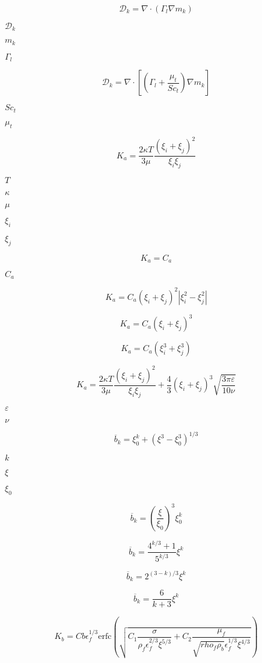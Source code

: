 \documentclass{article}
\begin{document}
\[ \mathcal{D}_k = \nabla \cdot \left( \Gamma_l \nabla m_k \right) \]
\pagebreak

$ \mathcal{D}_k $
\pagebreak

$ m_k $
\pagebreak

$ \Gamma_l $
\pagebreak

\[ \mathcal{D}_k = \nabla \cdot \left[ \left( \Gamma_l + \frac{\mu_t}{Sc_t} \right) \nabla m_k \right] \]
\pagebreak

$ Sc_t $
\pagebreak

$ \mu_t $
\pagebreak

\[ K_a = \frac{2 \kappa T}{3 \mu} \frac{(\xi_i + \xi_j)^2}{\xi_i \xi_j} \]
\pagebreak

$ T $
\pagebreak

$ \kappa $
\pagebreak

$ \mu $
\pagebreak

$ \xi_i $
\pagebreak

$ \xi_j $
\pagebreak

\[ K_a = C_a \]
\pagebreak

$ C_a $
\pagebreak

\[ K_a = C_a (\xi_i + \xi_j)^2 |\xi_i^2 - \xi_j^2| \]
\pagebreak

\[ K_a = C_a (\xi_i + \xi_j)^3 \]
\pagebreak

\[ K_a = C_a (\xi_i^3 + \xi_j^3) \]
\pagebreak

\[ K_a = \frac{2 \kappa T}{3 \mu} \frac{(\xi_i + \xi_j)^2}{\xi_i \xi_j} + \frac{4}{3} (\xi_i + \xi_j)^3 \sqrt{\frac{3 \pi \varepsilon}{10 \nu}} \]
\pagebreak

$ \varepsilon $
\pagebreak

$ \nu $
\pagebreak

\[ \overline{b}_k = \xi_0^k + (\xi^3 - \xi_0^3)^{1/3} \]
\pagebreak

$ k $
\pagebreak

$ \xi $
\pagebreak

$ \xi_0 $
\pagebreak

\[ \overline{b}_k = \left( \frac{\xi}{\xi_0} \right)^3 \xi_0^k \]
\pagebreak

\[ \overline{b}_k = \frac{4^{k/3} + 1}{5^{k/3}} \xi^k \]
\pagebreak

\[ \overline{b}_k = 2^{(3-k)/3} \xi^k \]
\pagebreak

\[ \overline{b}_k = \frac{6}{k + 3} \xi^k \]
\pagebreak

\[ K_b = Cb \epsilon_f^{1/3} \text{erfc} \left( \sqrt{ C_1 \frac{\sigma}{\rho_f \epsilon_f^{2/3} \xi^{5/3}} + C_2 \frac{\mu_f} {\sqrt{rho_f \rho_b} \epsilon_f^{1/3} \xi^{4/3}} } \right) \]
\pagebreak
\end{document}

